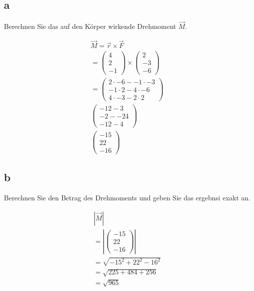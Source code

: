 \subsection{a}
Berechnen Sie das auf den Körper wirkende Drehmoment $\vec{M}$.

\begin{align*}
    \vec{M} = \vec{r} \times \vec{F} \\
    = \begin{pmatrix}
        4 \\ 2 \\ -1 
    \end{pmatrix} \times \begin{pmatrix}
        2 \\ -3 \\ -6
    \end{pmatrix} \\
    = \begin{pmatrix}
        2 \cdot -6 - -1 \cdot -3 \\
        -1 \cdot 2 - 4 \cdot -6 \\
        4 \cdot -3 - 2 \cdot 2
    \end{pmatrix} \\
    \begin{pmatrix}
        -12 - 3 \\
        -2 - -24 \\
        -12 -4
    \end{pmatrix} \\
    \begin{pmatrix}
        -15 \\
        22 \\
        -16
    \end{pmatrix}
\end{align*}

\subsection{b}

Berechnen Sie den Betrag des Drehmoments und geben Sie das ergebnsi exakt an. 

\begin{align*}
    \left|\vec{M}\right| \\
    = \left|\begin{pmatrix}
        -15 \\ 22 \\ -16
    \end{pmatrix}\right| \\
    = \sqrt{-15^2 + 22^2 -16^2} \\
    = \sqrt{225 + 484 + 256} \\
    = \sqrt{965}
\end{align*}